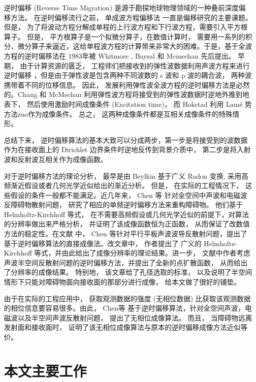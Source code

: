 逆时偏移 (Reverse Time Migration) 是源于勘探地球物理领域的一种叠前深度偏移方法。 在逆时偏移流行之前， 单成波方程偏移法\cite{claerbout1972downward,gazdag1978wave} 一直是偏移研究的主要课题。但是， 为了将波动方程分解成单程的上行波方程和下行波方程，需要引入平方根算子\cite{zhanggq1993,Zhang2007}。 但是， 平方根算子是一个拟微分算子，在数值计算时， 需要用一系列的积分、微分算子来逼近，这给单程波方程的计算带来非常大的困难。于是，基于全波方程的逆时偏移法在 1983年被 Whitmore \cite{whitmore1983iterative}, Baysal \cite{baysal1983reverse} 和 Mcmechan  \cite{mcmechan1983migration} 先后提出。 早期， 由于计算资源的匮乏， 工程师们把接收到的弹性波数据利用声波方程来进行逆时偏移 \cite{zhang2009,Zhang08,bleistein2013mathematics,claerbout1985imaging,berkhout2012seismic}，但是由于弹性波是包含两种不同波数的 s 波和 p 波的耦合波， 两种波携带着不同的位移信息\cite{yan2008isotropic}。 因此， 发展利用弹性波全波方程的逆时偏移方法是必然的。Chang 和 McMechan \cite{chang1986reverse} 利用弹性波方程将接受到的弹性波数据时逆地外推到地表下， 然后使用激励时间成像条件 (Excitation time)， 而 Hokstad\cite{hokstad1998elastic} 利用 {Lam\'{e}} 势方法zuo作为成像条件。 总之， 这两种成像条件都是互相关成像条件的特殊情形\cite{yan2008isotropic}。

总结下来， 逆时偏移算法的基本大致可以分成两步，第一步是将接受到的波数据作为在接收面上的 Dirichlet 边界条件时逆地反传到背景介质中， 第二步是将入射波和反射波互相关作为成像函数。

对于逆时偏移方法的理论分析， 最早是由 Beylkin \cite{beylkin1984inversion,beylkin1985imaging,beylkin1990linearized} 基于广义 Radon 变换, 采用高
频渐近假设或者几何光学近似给出的渐近分析。 但是， 在实际的工程情况下， 这些假设的条件一般都不能满足。近几年来， Chen 等\cite{chen2013reverse_acou,chen2013reverse_elec} 针对全空间中声波和电磁波反障碍物散射问题， 研究了相应的单频逆时偏移方法来重构障碍物。 他们基于  Helmholtz-Kirchhoff 等式， 在不需要高频假设或几何光学近似的前提下，对算法的分辨率做出来严格分析， 并证明了该成像函数恒为正函数， 从而保证了改数值方法的稳定性。在文献 \cite{chen2015reverse_planar} 中， Chen 等针对平行平板声波波导反散射问题，提出了基于逆时偏移算法的直接成像法。改文章中， 作者提出了 广义的 Helmholtz-Kirchhoff 等式，并由此给出了成像分辨率的理论结果。进一步， 文献\cite{RTMhalf_aco}中作者考虑声波半空间反散射问题的逆时偏移方法，并提出了全新的点扩散函数， 从而给出了分辨率的成像结果。 特别地， 该文章给了孔径选取的标准， 以及说明了半空间情形下只能对障碍物面向接收面的那部分进行成像， 给本文做了很好的铺垫。

由于在实际的工程应用中， 获取观测数据的强度 (无相位数据) 比获取该观测数据的相位信息要容易很多。由此， Chen等 \cite{chen2017phaseless,chen2016direct,chen2017direct} 基于逆时偏移算法，针对全空间声波，电磁波以及半空间声波反散射问题， 提出了无相位成像算法。 而且， 当障碍物远离发射面和接收面时， 证明了该无相位成像算法与原本的逆时偏移成像方法近似等价。




\section{本文主要工作}
